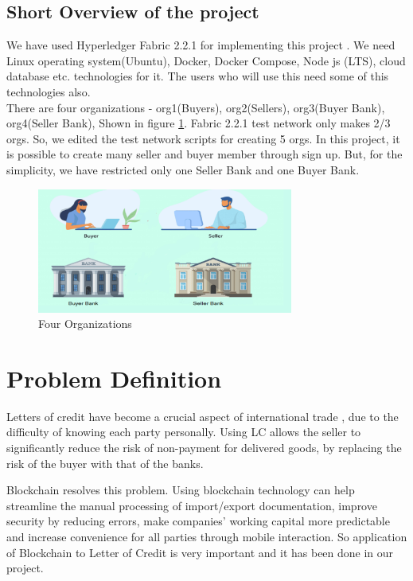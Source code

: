 \documentclass[a4paper,12pt]{report}
\begin{document}
\section{Short Overview of the project}
We have used Hyperledger Fabric 2.2.1 for implementing this project \cite{fabric}. We need Linux operating system(Ubuntu), Docker, Docker Compose, Node js (LTS), cloud database etc. technologies for it. The users who will use this need some of this technologies also.\\
There are four organizations - org1(Buyers), org2(Sellers), org3(Buyer Bank),  org4(Seller Bank), {\large Shown in figure \ref{fig:organization}}. Fabric 2.2.1 test network only makes 2/3 orgs. So, we edited the test network scripts for creating 5 orgs. In this project, it is possible to create many seller and buyer member through sign up. But, for the simplicity, we have restricted only one Seller Bank and one Buyer Bank.
\begin{figure}[h]
    \centering
    \includegraphics[width=0.75\textwidth]{Organization.pdf}
    \caption{Four Organizations}
    \label{fig:organization}
\end{figure}


\chapter{Problem Definition}
Letters of credit have become a crucial aspect of international trade , due to the difficulty of knowing each party personally. Using LC allows the seller to significantly reduce the risk of non-payment for delivered goods, by replacing the risk of the buyer with that of the banks.

Blockchain resolves this problem. Using blockchain technology can help streamline the manual processing of import/export documentation, improve security by reducing errors, make companies' working capital more predictable and increase convenience for all parties through mobile interaction. So application of Blockchain to Letter of Credit is very important and it has been done in our project. 
\end{document}
